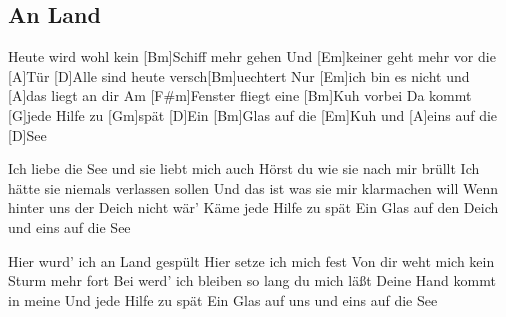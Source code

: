 \subsection*{An Land   }
\begin{guitar}
[D]Heute wird wohl kein [Bm]Schiff mehr gehen
Und [Em]keiner geht mehr vor die [A]Tür
[D]Alle sind heute versch[Bm]uechtert
Nur [Em]ich bin es nicht und [A]das liegt an dir
Am [F#m]Fenster fliegt eine [Bm]Kuh vorbei
Da kommt [G]jede Hilfe zu [Gm]spät
[D]Ein [Bm]Glas auf die [Em]Kuh und [A]eins auf die [D]See

Ich liebe die See und sie liebt mich auch
Hörst du wie sie nach mir brüllt
Ich hätte sie niemals verlassen sollen
Und das ist was sie mir klarmachen will
Wenn hinter uns der Deich nicht wär'
Käme jede Hilfe zu spät
Ein Glas auf den Deich und eins auf die See

Hier wurd' ich an Land gespült
Hier setze ich mich fest
Von dir weht mich kein Sturm mehr fort
Bei werd' ich bleiben so lang du mich läßt
Deine Hand kommt in meine
Und jede Hilfe zu spät
Ein Glas auf uns und eins auf die See
\end{guitar}
